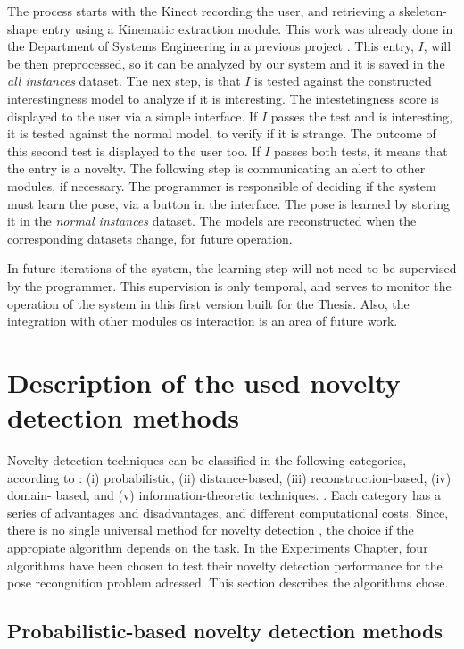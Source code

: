 The process starts with the Kinect recording the user, and retrieving a skeleton-shape entry using a Kinematic extraction module. This work was already done in the Department of Systems Engineering in a previous project \cite{Gonzalez-Pacheco2013}. This entry, $I$, will be then preprocessed, so it can be analyzed by our system and it is saved in the \emph{all instances} dataset. The nex step, is that $I$ is tested against the constructed interestingness model to analyze if it is interesting. The intestetingness score is displayed to the user via a simple interface. If $I$ passes the test and is interesting, it is tested against the normal model, to verify if it is strange. The outcome of this second test is displayed to the user too. If $I$ passes both tests, it means that the entry is a novelty. The following step is communicating an alert to other modules, if necessary. The programmer is responsible of deciding if the system must learn the pose, via a button in the interface. The pose is learned by storing it in the \emph{normal instances} dataset. The models are reconstructed when the corresponding datasets change, for future operation. 

In future iterations of the system, the learning step will not need to be supervised by the programmer. This supervision is only temporal, and serves to monitor the operation of the system in this first version built for the Thesis. Also, the integration with other modules os interaction is an area of future work.

\section{Description of the used novelty detection methods} \label{3.6}

Novelty detection techniques can be classified in the following categories, according to \cite{Pimentel2014}: 
(i) probabilistic, (ii) distance-based, (iii) reconstruction-based, (iv) domain- based, and (v) information-theoretic techniques. \cite{Pimentel2014}. Each category has a series of advantages and disadvantages, and different computational costs. Since, there is no single universal method for novelty detection \cite{Nehmzow2013}, the choice if the appropiate algorithm depends on the task. In the Experiments Chapter, four algorithms have been chosen to test their novelty detection performance for the pose recongnition problem adressed. This section describes the algorithms chose. 

\subsection{Probabilistic-based novelty detection methods}

